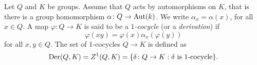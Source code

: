 %
%
%
%
%	
%	
%


Let $Q$ and $K$ be groups. Assume that $Q$ acts by automorphisms on $K$, that is there is a group homomorphism $\alpha\colon Q\rightarrow \operatorname{Aut}(k)$. We write $\alpha_x=\alpha(x)$, for all $x\in Q$.
A map $\varphi\colon Q\to K$ is said to be a {\em $1$-cocycle} (or a {\em derivation}) if
\[
		\varphi(xy)=\varphi(x)\alpha_x(\varphi(y))
\]
for all $x,y\in Q$.  The set of 1-cocycles $Q\to K$ is defined as 
\[
\operatorname{Der}(Q,K)=Z^1(Q,K)=\{\delta\colon Q\to K:\text{$\delta$ is $1$-cocycle}\}.
\]

